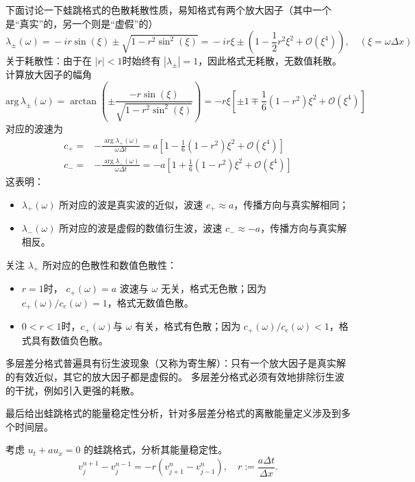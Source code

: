 下面讨论一下蛙跳格式的色散耗散性质，易知格式有两个放大因子（其中一个是“真实”的，另一个则是“虚假”的）
\[
    \lambda_{\pm}(\omega) ={} - i r \sin(\xi) \pm \sqrt{1 - r^2 \sin^2(\xi)}
    ={}  - i r \xi \pm \left(
    1 - \frac12 r^2 \xi^2 + \mathcal{O}(\xi^4)
    \right), \quad (\xi = \omega \Delta x)
\]
关于耗散性：由于在 $|r| < 1$时始终有 $|\lambda_\pm| = 1$，因此格式无耗散，无数值耗散。
计算放大因子的幅角
\[
    \text{arg}\, \lambda_\pm(\omega)
        ={}
    \arctan \left( \pm \frac{
        - r \sin(\xi)
    }{
        \sqrt{1 - r^2 \sin^2(\xi)}
    }     \right)
    = - r \xi \left[
        \pm 1 \mp \frac16 (1-r^2) \xi^2 + \mathcal{O}(\xi^4)
        \right]
\]
对应的波速为
\begin{align*}
    c_+ ={} & - \frac{\arg \lambda_+(\omega)}{ \omega\Delta t} = a  \left[
        1 - \frac16 (1-r^2) \xi^2 +  \mathcal{O}(\xi^4)
    \right]                                                                  \\
    c_- ={} & - \frac{\arg \lambda_-(\omega)}{ \omega\Delta t} = - a  \left[
        1 + \frac16 (1-r^2) \xi^2 +  \mathcal{O}(\xi^4)
        \right]
\end{align*}
这表明：
\begin{itemize}
    \item $\lambda_+(\omega)$ 所对应的波是真实波的近似，波速 $c_+ \approx a$，传播方向与真实解相同；
    \item $\lambda_-(\omega)$ 所对应的波是虚假的数值衍生波，波速 $c_- \approx -a$，传播方向与真实解相反。
\end{itemize}
关注 $\lambda_+$ 所对应的色散性和数值色散性：
\begin{itemize}
    \item $r=1$时， $c_+(\omega) = a$ 波速与 $\omega$ 无关，格式无色散；因为 $c_+(\omega) / c_e(\omega) = 1$，格式无数值色散。
    \item $0<r<1$时，$c_+(\omega)$与 $\omega$ 有关，格式有色散；因为 $c_+(\omega) / c_e(\omega) < 1$，格式具有数值负色散。
\end{itemize}

\begin{remark}
    多层差分格式普遍具有衍生波现象（又称为寄生解）：只有一个放大因子是真实解的有效近似，其它的放大因子都是虚假的。
    多层差分格式必须有效地排除衍生波的干扰，例如引入更强的耗散。
\end{remark}

最后给出蛙跳格式的能量稳定性分析，针对多层差分格式的离散能量定义涉及到多个时间层。
\begin{example}
    考虑 $u_t + a u_x = 0$ 的蛙跳格式，分析其能量稳定性。
    \[
        v_j^{n+1}-v_j^{n-1} =
        - r (v_{j+1}^n - v_{j-1}^{n}),\quad r := \frac{a \Delta t}{\Delta x}.
    \]
\end{example}

